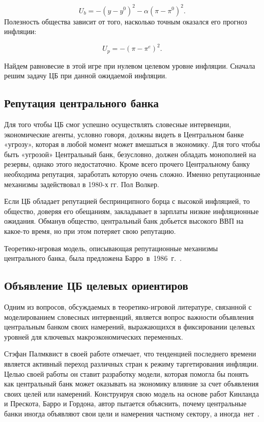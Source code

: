 \begin{equation}\label{T3-2}
U_b = -(y - y^0)^2 - \alpha (\pi - \pi^0)^2.
\end{equation}
Полезность общества зависит от того, насколько точным оказался его прогноз инфляции:

\begin{equation}\label{T3-3}
U_p = -(\pi - \pi^e)^2.
\end{equation}

Найдем равновесие в этой игре при нулевом целевом уровне инфляции. Сначала решим задачу ЦБ при данной ожидаемой инфляции.

\subsection{Репутация центрального банка}

Для того чтобы ЦБ смог успешно осуществлять словесные интервенции, экономические агенты, условно говоря, должны видеть в Центральном банке «угрозу», которая в любой момент может вмешаться в экономику. Для того чтобы быть «угрозой» Центральный банк, безусловно, должен обладать монополией на резервы, однако этого недостаточно. Кроме всего прочего Центральному банку необходима репутация, заработать которую очень сложно. Именно репутационные механизмы задействовал в 1980-х гг. Пол Волкер.

Если ЦБ обладает репутацией беспринципного борца с высокой инфляцией, то общество, доверяя его обещаниям, закладывает в зарплаты низкие инфляционные ожидания. Обманув общество, центральный банк добьется высокого ВВП на какое-то время, но при этом потеряет свою репутацию. 

Теоретико-игровая модель, описывающая репутационные механизмы центрального банка, была предложена Барро~в~1986~г.~\cite{barro1986reputation}.


\subsection{Объявление ЦБ целевых ориентиров} 
Одним из вопросов, обсуждаемых в теоретико-игровой литературе, связанной с моделированием словесных интервенций, является вопрос важности объявления центральным банком своих намерений, выражающихся в фиксировании целевых уровней для ключевых макроэкономических переменных.   
  
Стэфан Палмквист в своей работе отмечает, что тенденцией последнего времени является активный переход различных стран к режиму таргетирования инфляции. Целью своей работы он ставит разработку модели, которая помогла бы понять как центральный банк может оказывать на экономику влияние за счет объявления своих целей или намерений. Конструируя свою модель на основе работ Кинланда и Прескота, Барро и Гордона, автор пытается объяснить, почему центральные банки иногда объявляют свои цели и намерения частному сектору, а иногда~нет~\cite{palmqvist1998central}. 

